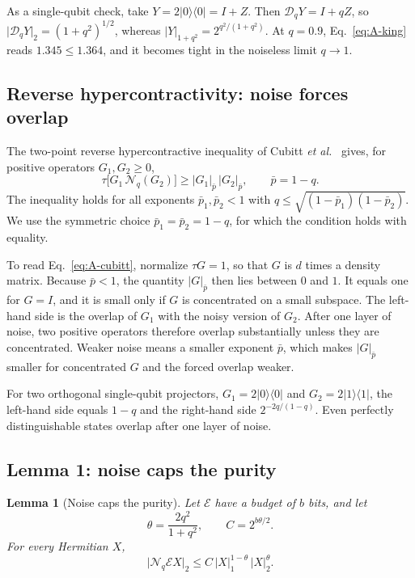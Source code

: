 \documentclass[aps,pra,reprint,superscriptaddress,floatfix]{revtex4-2}
\theoremstyle{plain}
\newtheorem{lemma}{Lemma}
\newcommand{\ketbra}[2]{|#1\rangle\!\langle #2|}
\newcommand{\nrm}[2]{\lvert #1\rvert_{#2}}
\newcommand{\cD}{\mathcal D}
\newcommand{\cE}{\mathcal E}
\newcommand{\Nq}{\mathcal N_q}
\begin{document}
As a single-qubit check, take $Y=2\ketbra00=I+Z$. Then $\cD_qY=I+qZ$, so $\nrm{\cD_qY}2=(1+q^2)^{1/2}$, whereas $\nrm Y{1+q^2}=2^{q^2/(1+q^2)}$. At $q=0.9$, Eq.~\eqref{eq:A-king} reads $1.345\le1.364$, and it becomes tight in the noiseless limit $q\to1$.

\subsection{Reverse hypercontractivity: noise forces overlap}
\label{app:reverse}

The two-point reverse hypercontractive inequality of Cubitt \emph{et al.}~\cite[Corollary~14]{Cubitt2015} gives, for positive operators $G_1,G_2\ge0$,
\begin{equation}
\tau\bigl[G_1\,\Nq(G_2)\bigr]\ge\nrm{G_1}{\bar p}\,\nrm{G_2}{\bar p},\qquad\bar p=1-q .
\label{eq:A-cubitt}
\end{equation}
The inequality holds for all exponents $\bar p_1,\bar p_2<1$ with $q\le\sqrt{(1-\bar p_1)(1-\bar p_2)}$. We use the symmetric choice $\bar p_1=\bar p_2=1-q$, for which the condition holds with equality.

To read Eq.~\eqref{eq:A-cubitt}, normalize $\tau G=1$, so that $G$ is $d$ times a density matrix. Because $\bar p<1$, the quantity $\nrm G{\bar p}$ then lies between $0$ and $1$. It equals one for $G=I$, and it is small only if $G$ is concentrated on a small subspace. The left-hand side is the overlap of $G_1$ with the noisy version of $G_2$. After one layer of noise, two positive operators therefore overlap substantially unless they are concentrated. Weaker noise means a smaller exponent $\bar p$, which makes $\nrm G{\bar p}$ smaller for concentrated $G$ and the forced overlap weaker.

For two orthogonal single-qubit projectors, $G_1=2\ketbra00$ and $G_2=2\ketbra11$, the left-hand side equals $1-q$ and the right-hand side $2^{-2q/(1-q)}$. Even perfectly distinguishable states overlap after one layer of noise.

\subsection{Lemma 1: noise caps the purity}
\label{app:cap}

\begin{lemma}[Noise caps the purity]\label{lem:cap}
Let $\cE$ have a budget of $b$ bits, and let
\begin{equation}
\theta=\frac{2q^2}{1+q^2},\qquad C=2^{b\theta/2}.
\label{eq:A-thetaC}
\end{equation}
For every Hermitian $X$,
\begin{equation}
\nrm{\Nq\cE X}2\le C\,\nrm X1^{1-\theta}\,\nrm X2^{\theta}.
\end{equation}
\end{lemma}
\end{document}
